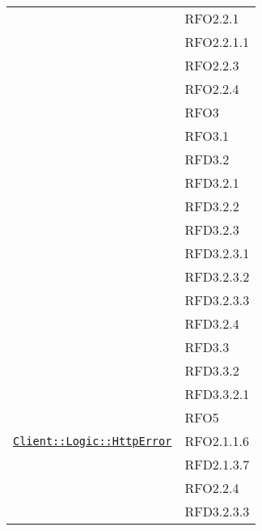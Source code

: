 \begin{longtable}{|>{\centering}m{10cm}|m{3cm}<{\centering}|}
& RFO2.2.1\\
& RFO2.2.1.1\\
& RFO2.2.3\\
& RFO2.2.4\\
& RFO3\\
& RFO3.1\\
& RFD3.2\\
& RFD3.2.1\\
& RFD3.2.2\\
& RFD3.2.3\\
& RFD3.2.3.1\\
& RFD3.2.3.2\\
& RFD3.2.3.3\\
& RFD3.2.4\\
& RFD3.3\\
& RFD3.3.2\\
& RFD3.3.2.1\\
& RFO5\\ \hline

\hyperref[Client::Logic::HttpError]{\texttt{Client::Logic::HttpError}} & RFO2.1.1.6\\
& RFD2.1.3.7\\
& RFO2.2.4\\
& RFD3.2.3.3\\ \hline


\end{longtable}
